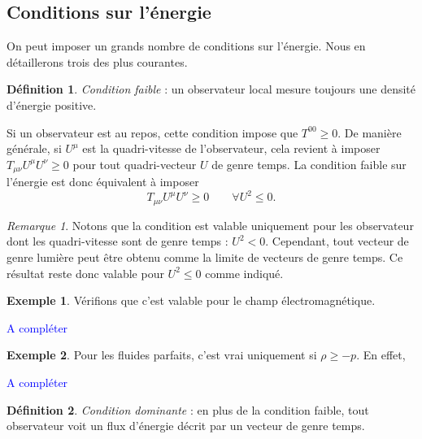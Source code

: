\documentclass[a4paper,11pt]{report}
\theoremstyle{definition}
\theoremstyle{plain}
\theoremstyle{definition}
\newtheorem{defn}{Définition}[chapter]
\newtheorem{exmp}{Exemple}[chapter]
\theoremstyle{remark}
\newtheorem{rmk}{Remarque}[chapter]
\newcommand{\comp}{\begin{center}\textcolor{blue}{A compléter}\end{center}}
\begin{document}
        \subsection{Conditions sur l'énergie}
        
            On peut imposer un grands nombre de conditions sur l'énergie. Nous en détaillerons trois des plus courantes.
            
            \begin{defn}
                \textit{Condition faible} : un observateur local mesure toujours une densité d'énergie positive.
            \end{defn}
            
            Si un observateur est au repos, cette condition impose que $T^{00}\geq 0$. De manière générale, si $U^\mu$ est la quadri-vitesse de l'observateur, cela revient à imposer $T_{\mu\nu}U^\mu U^\nu \geq 0$ pour tout quadri-vecteur $U$ de genre temps. La condition faible sur l'énergie est donc équivalent à imposer 
            \begin{equation}
                T_{\mu\nu}U^\mu U^\nu \geq 0\qquad \forall U^2\leq 0.
            \end{equation}
            
            \begin{rmk}
                Notons que la condition est valable uniquement pour les observateur dont les quadri-vitesse sont de genre temps : $U^2<0$. Cependant, tout vecteur de genre lumière peut être obtenu comme la limite de vecteurs de genre temps. Ce résultat reste donc valable pour $U^2\leq0$ comme indiqué.
            \end{rmk}
            
            \begin{exmp}
                Vérifions que c'est valable pour le champ électromagnétique.
                \comp
            \end{exmp}
            
            \begin{exmp}
                Pour les fluides parfaits, c'est vrai uniquement si $\rho\geq -p$. En effet,
                \comp
            \end{exmp}
            
            \begin{defn}
                \textit{Condition dominante} : en plus de la condition faible, tout observateur voit un flux d'énergie décrit par un vecteur de genre temps.
            \end{defn}
            
\end{document}
